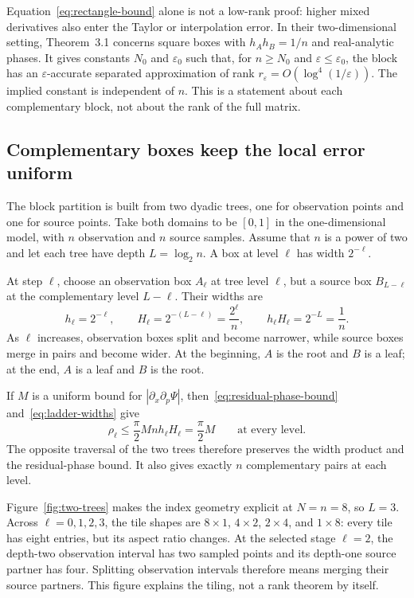 \documentclass[11pt,a4paper]{article}
\begin{document}
Equation~\eqref{eq:rectangle-bound} alone is not a low-rank proof: higher mixed derivatives also enter the Taylor or interpolation error. In their two-dimensional setting, Theorem~3.1 concerns square boxes with $h_Ah_B=1/n$ and real-analytic phases. It gives constants $N_0$ and $\varepsilon_0$ such that, for $n\geq N_0$ and $\varepsilon\leq\varepsilon_0$, the block has an $\varepsilon$-accurate separated approximation of rank $r_\varepsilon=O(\log^4(1/\varepsilon))$. The implied constant is independent of $n$. This is a statement about each complementary block, not about the rank of the full matrix.

\subsection{Complementary boxes keep the local error uniform}
\label{subsec:complementary-boxes}

The block partition is built from two dyadic trees, one for observation points and one for source points. Take both domains to be $[0,1]$ in the one-dimensional model, with $n$ observation and $n$ source samples. Assume that $n$ is a power of two and let each tree have depth $L=\log_2 n$. A box at level $\ell$ has width $2^{-\ell}$.

At step $\ell$, choose an observation box $A_\ell$ at tree level $\ell$, but a source box $B_{L-\ell}$ at the complementary level $L-\ell$. Their widths are
\begin{equation}
    h_\ell=2^{-\ell},
    \qquad
    H_\ell=2^{-(L-\ell)}=\frac{2^\ell}{n},
    \qquad
    h_\ell H_\ell=2^{-L}=\frac1n.
    \label{eq:ladder-widths}
\end{equation}
As $\ell$ increases, observation boxes split and become narrower, while source boxes merge in pairs and become wider. At the beginning, $A$ is the root and $B$ is a leaf; at the end, $A$ is a leaf and $B$ is the root.

If $M$ is a uniform bound for $|\partial_x\partial_p\Psi|$, then~\eqref{eq:residual-phase-bound} and~\eqref{eq:ladder-widths} give
\begin{equation}
    \rho_\ell
    \leq \frac{\pi}{2}M n h_\ell H_\ell
    =\frac{\pi}{2}M
    \qquad\text{at every level}.
    \label{eq:constant-residual}
\end{equation}
The opposite traversal of the two trees therefore preserves the width product and the residual-phase bound. It also gives exactly $n$ complementary pairs at each level.

Figure~\ref{fig:two-trees} makes the index geometry explicit at $N=n=8$, so $L=3$. Across $\ell=0,1,2,3$, the tile shapes are $8\times1$, $4\times2$, $2\times4$, and $1\times8$: every tile has eight entries, but its aspect ratio changes. At the selected stage $\ell=2$, the depth-two observation interval has two sampled points and its depth-one source partner has four. Splitting observation intervals therefore means merging their source partners. This figure explains the tiling, not a rank theorem by itself.
\end{document}

